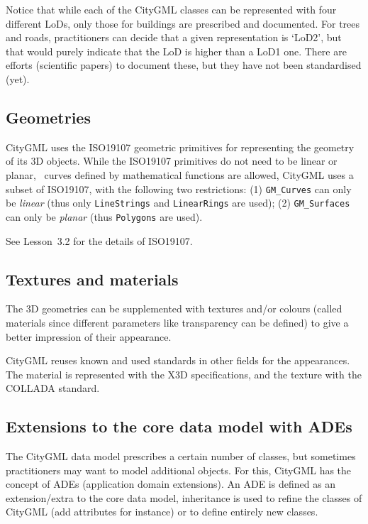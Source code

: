 %

Notice that while each of the CityGML classes can be represented with four different LoDs, only those for buildings are prescribed and documented.
For trees and roads, practitioners can decide that a given representation is `LoD2', 
but that would purely indicate that the LoD is higher than a LoD1 one.
There are efforts (scientific papers) to document these, but they have not been standardised (yet).


\subsection{Geometries}

CityGML uses the ISO19107 geometric primitives for representing the geometry of its 3D objects.
While the ISO19107 primitives do not need to be linear or planar, \ie\ curves defined by mathematical functions are allowed, CityGML uses a subset of ISO19107, with the following two restrictions: (1) \texttt{GM\_Curves} can only be \emph{linear} (thus only \texttt{LineStrings} and \texttt{LinearRings} are used); (2) \texttt{GM\_Surfaces} can only be \emph{planar} (thus \texttt{Polygons} are used).

See Lesson~3.2 for the details of ISO19107.


\subsection{Textures and materials}
The 3D geometries can be supplemented with textures and/or colours (called materials since different parameters like transparency can be defined) to give a better impression of their appearance.

CityGML reuses known and used standards in other fields for the appearances.
The material is represented with the X3D specifications, and the texture with the COLLADA standard.


\subsection{Extensions to the core data model with ADEs} 

The CityGML data model prescribes a certain number of classes, but sometimes practitioners may want to model additional objects.
For this, CityGML has the concept of ADEs (application domain extensions).
An ADE is defined as an extension/extra to the core data model, inheritance is used to refine the classes of CityGML (add attributes for instance) or to define entirely new classes.

